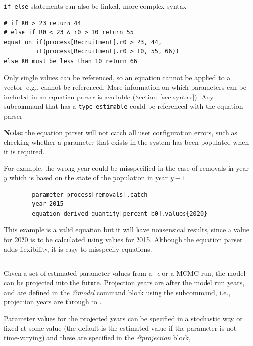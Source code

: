 \texttt{if-else} statements can also be linked, more complex syntax

{\small{\begin{verbatim}
# if R0 > 23 return 44
# else if R0 < 23 & r0 > 10 return 55
equation if(process[Recruitment].r0 > 23, 44,
         if(process[Recruitment].r0 > 10, 55, 66))
else R0 must be less than 10 return 66
\end{verbatim}}}

Only single values can be referenced, so an equation cannot be applied to a vector, e.g.,  cannot be referenced. More information on which parameters can be included in an equation parser is available (Section~\ref{sec:syntax}). Any subcommand that has a \texttt{type estimable} could be referenced with the equation parser.

\textbf{Note:} the equation parser will not catch all user configuration errors, such as checking whether a parameter that exists in the system has been populated when it is required.

For example, the wrong year could be misspecified in the case of removals in year $y$ which is based on the state of the population in year $y-1$

{\small{\begin{verbatim}
		parameter process[removals].catch
		year 2015
		equation derived_quantity[percent_b0].values{2020}
\end{verbatim}}}

This example is a valid equation but it will have nonsensical results, since a value for 2020 is to be calculated using values for 2015. Although the equation parser adds flexibility, it is easy to misspecify equations.


\subsection{}\label{sec:Project} 

Given a set of estimated parameter values from a \textit{-e} or a MCMC run,
the model can be projected into the future. Projection years are after the model run years, and are defined in the \textit{@model} command block using the  subcommand, i.e., projection years are  through to .

Parameter values for the projected years can be specified in a stochastic way or fixed at some value (the default is the estimated value if the parameter is not time-varying) and these are specified in the \textit{@projection} block,

